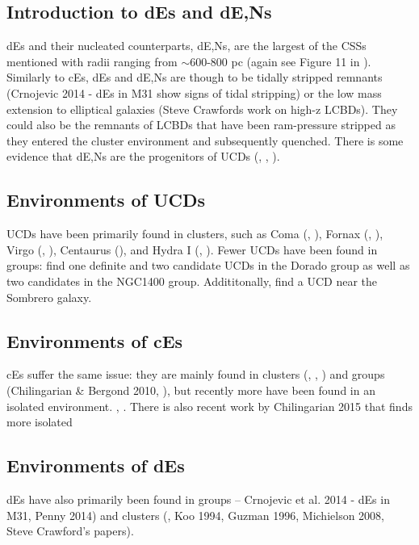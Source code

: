 \documentclass[iop,apj,twocolappendix]{emulateapj}
\begin{document}
\subsection{Introduction to dEs and dE,Ns}
dEs and their nucleated counterparts, dE,Ns, are the largest of the CSSs mentioned with radii ranging from $\sim$600-800 pc (again see Figure 11 in \cite{Norris2014}). Similarly to cEs, dEs and dE,Ns are though to be tidally stripped remnants (Crnojevic 2014 - dEs in M31 show signs of tidal stripping) or the low mass extension to elliptical galaxies (Steve Crawfords work on high-z LCBDs). They could also be the remnants of LCBDs that have been ram-pressure stripped as they entered the cluster environment and subsequently quenched. There is some evidence that dE,Ns are the progenitors of UCDs (\cite{Pfeffer2013}, \cite{Zhang2015}, \cite{Liu2015}).

\subsection{Environments of UCDs}
UCDs have been primarily found in clusters, such as Coma (\cite{Price2009}, \cite{Madrid2010}), Fornax (\cite{Hilker1999}, \cite{Drinkwater2000}), Virgo (\cite{Hasegan2005}, \cite{Jones2006}), Centaurus (\cite{Mieske2009}), and Hydra I (\cite{Wehner2007}, \cite{Misgeld2008}). Fewer UCDs have been found in groups: \cite{Evstigneeva2007} find one definite and two candidate UCDs in the Dorado group as well as two candidates in the NGC1400 group. Addititonally, \cite{Hau2009} find a UCD near the Sombrero galaxy. 

\subsection{Environments of cEs}
cEs suffer the same issue: they are mainly found in clusters (\cite{Chilingarian2007}, \cite{SmithCastelli2012}, \cite{Price2009}) and groups (Chilingarian \& Bergond 2010, \cite{Huxor2011}), but recently more have been found in an isolated environment. \cite{Huxor2013}, \cite{Paudel2014}. There is also recent work by Chilingarian 2015 that finds more isolated 

\subsection{Environments of dEs}
dEs have also primarily been found in groups -- Crnojevic et al. 2014 - dEs in M31, Penny 2014) and clusters (\cite{SmithCastelli2012}, Koo 1994, Guzman 1996, Michielson 2008, Steve Crawford's papers). 
\end{document}
